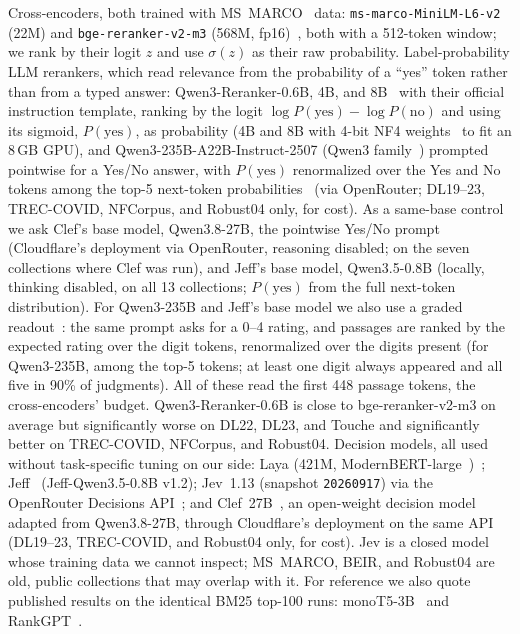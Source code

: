 Cross-encoders, both trained with MS~MARCO~\cite{bajaj2016msmarco} data: \texttt{ms-marco-MiniLM-L6-v2} (22M) and \texttt{bge-reranker-v2-m3} (568M, fp16)~\cite{bgererankerv2m3,chen2024bgem3}, both with a 512-token window; we rank by their logit $z$ and use $\sigma(z)$ as their raw probability.
Label-probability LLM rerankers, which read relevance from the probability of a ``yes'' token rather than from a typed answer: Qwen3-Reranker-0.6B, 4B, and 8B~\cite{qwen3embedding} with their official instruction template, ranking by the logit $\log P(\text{yes})-\log P(\text{no})$ and using its sigmoid, $P(\text{yes})$, as probability (4B and 8B with 4-bit NF4 weights~\cite{dettmers2023qlora} to fit an 8\,GB GPU), and Qwen3-235B-A22B-Instruct-2507 (Qwen3 family~\cite{qwen3}) prompted pointwise for a Yes/No answer, with $P(\text{yes})$ renormalized over the Yes and No tokens among the top-5 next-token probabilities~\cite{zhuang2023beyond} (via OpenRouter; DL19--23, TREC-COVID, NFCorpus, and Robust04 only, for cost).
As a same-base control we ask Clef's base model, Qwen3.8-27B, the pointwise Yes/No prompt (Cloudflare's deployment via OpenRouter, reasoning disabled; on the seven collections where Clef was run), and Jeff\kern0pt's base model, Qwen3.5-0.8B (locally, thinking disabled, on all 13 collections; $P(\text{yes})$ from the full next-token distribution).
For Qwen3-235B and Jeff's base model we also use a graded readout~\cite{zhuang2023beyond}: the same prompt asks for a 0--4 rating, and passages are ranked by the expected rating over the digit tokens, renormalized over the digits present (for Qwen3-235B, among the top-5 tokens; at least one digit always appeared and all five in 90\% of judgments). All of these read the first 448 passage tokens, the cross-encoders' budget. Qwen3-Reranker-0.6B is close to bge-reranker-v2-m3 on average but significantly worse on DL22, DL23, and Touche and significantly better on TREC-COVID, NFCorpus, and Robust04.
Decision models, all used without task-specific tuning on our side: Laya (421M, ModernBERT-large~\cite{warner2024modernbert})~\cite{laya}; Jeff~\cite{jeff} (Jeff-Qwen3.5-0.8B v1.2); Jev~1.13 (snapshot \texttt{20260917}) via the OpenRouter Decisions API~\cite{jev}; and Clef~27B~\cite{clef}, an open-weight decision model adapted from Qwen3.8-27B, through Cloudflare's deployment on the same API (DL19--23, TREC-COVID, and Robust04 only, for cost).
Jev is a closed model whose training data we cannot inspect; MS~MARCO, BEIR, and Robust04 are old, public collections that may overlap with it.
For reference we also quote published results on the identical BM25 top-100 runs: monoT5-3B~\cite{nogueira2020monot5} and RankGPT~\cite{sun2023rankgpt}.

